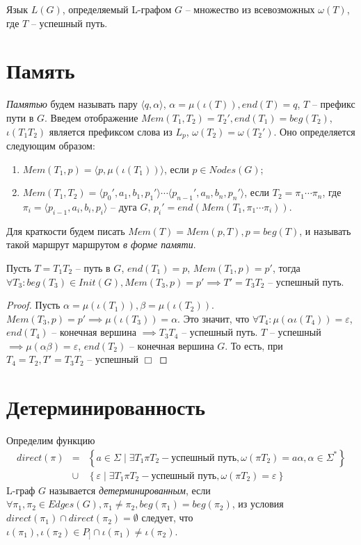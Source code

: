 Язык $L(G)$, определяемый L-графом $G$ -- множество из всевозможных $\omega(T)$, где $T$ -- успешный путь.

\section{Память}
\emph{Памятью} будем называть пару $\langle q, \alpha \rangle$, $\alpha=\mu(\iota(T)), end(T)=q$, $T$ --  префикс пути в $G$. 
Введем отображение $Mem(T_1,T_2) = T_2', end(T_1) = beg(T_2)$, $\iota(T_1 T_2)$ является префиксом слова из $L_p$, $\omega(T_2) = \omega(T_2')$.
Оно определяется следующим образом:
\begin{enumerate}[label=\arabic*)]
    \item $Mem(T_1, p) = \langle p, \mu(\iota(T_1)) \rangle$, если $p \in Nodes(G)$;
    \item {
        $Mem(T_1, T_2) = \langle p_0', a_1, b_1, p_1' \rangle \cdots \langle p_{n-1}', a_n, b_n, p_n' \rangle$, если $T_2 =\pi_1 \cdots \pi_n$, 
        где $\pi_i = \langle p_{i-1}, a_i, b_i, p_i \rangle$ -- дуга $G$, $p_i' = end(Mem(T_1, \pi_1 \cdots \pi_i))$.
    }
\end{enumerate}

Для краткости будем писать $Mem(T) = Mem(p, T), p = beg(T)$, и называть такой маршрут маршрутом \emph{в форме памяти}. 

\begin{lemma}
    \label{mem_continue_lemma}
    Пусть $T=T_1 T_2$ -- путь в $G$, $end(T_1) = p$, $Mem(T_1, p) = p'$, тогда $\forall T_3 : beg(T_3) \in Init(G), Mem(T_3, p) = p' \implies T' = T_3 T_2$ -- успешный путь. 
\end{lemma}
\begin{proof}
    Пусть $\alpha = \mu(\iota(T_1)), \beta = \mu(\iota(T_2))$.
    $Mem(T_3, p) = p' \implies \mu(\iota(T_3)) = \alpha$.
    Это значит, что $\forall T_4 : \mu(\alpha \iota(T_4)) = \varepsilon$, $end(T_4)$ -- конечная вершина  $\implies T_3 T_4$ -- успешный путь.
    $T$ -- успешный $\implies \mu(\alpha \beta) = \varepsilon$, $end(T_2)$ -- конечная вершина $G$. 
    То есть, при $T_4 = T_2, T' = T_3 T_2$ -- успешный $\Box$ 
\end{proof}

\section{Детерминированность}
Определим функцию \begin{eqnarray*}
    direct(\pi) & = & \left\{ a \in \Sigma \mid \exists T_1 \pi T_2 - \text{успешный путь}, \omega(\pi T_2) = a \alpha, \alpha \in \Sigma^* \right\} \\
    & \cup & \left\{ \varepsilon \mid \exists T_1 \pi T_2 - \text{успешный путь}, \omega(\pi T_2) = \varepsilon \right\}
\end{eqnarray*}
L-граф $G$ называется \emph{детерминированным}, если
$\forall \pi_1, \pi_2 \in Edges(G), \pi_1 \neq \pi_2, beg(\pi_1) = beg(\pi_2)$, 
из условия $direct(\pi_1) \cap direct(\pi_2) = \emptyset$ следует, что 
$\iota(\pi_1), \iota(\pi_2) \in P_] \cap \iota(\pi_1) \neq \iota(\pi_2)$. 

